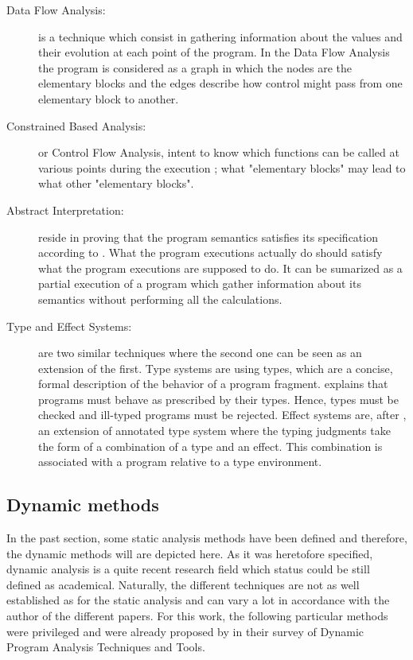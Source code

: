 \begin{description}
  \item[Data Flow Analysis:] is a technique which consist in gathering information about the values and their evolution at each point of the program. In the Data Flow Analysis the program is considered as a graph in which the nodes are the elementary blocks and the edges describe how control might pass from one elementary block to another.
  
  \item[Constrained Based Analysis:] or Control Flow Analysis, intent to know which functions can be called at various points during the execution ; what "elementary blocks" may lead to what other "elementary blocks".
  
  \item[Abstract Interpretation:] reside in proving that the program semantics satisfies its specification according to \cite{Cousot2008}. What the program executions actually do should satisfy what the program executions are supposed to do. It can be sumarized as a partial execution of a program which gather information about its semantics without performing all the calculations.
  
  \item[Type and Effect Systems:] are two similar techniques where the second one can be seen as an extension of the first. Type systems are using types, which are a concise, formal description of the behavior of a program fragment. \cite{Remy2017} explains that programs must behave as prescribed by their types. Hence, types must be checked and ill-typed programs must be rejected. Effect systems are, after \cite{Nielson1999}, an extension of annotated type system where the typing judgments take the form of a combination of a type and an effect. This combination is associated with a program relative to a type environment.
\end{description}


\subsection{Dynamic methods}

In the past section, some static analysis methods have been defined and therefore, the dynamic methods will are depicted here. As it was heretofore specified, dynamic analysis is a quite recent research field which status could be still defined as academical. Naturally, the different techniques are not as well established as for the static analysis and can vary a lot in accordance with the author of the different papers. For this work, the following particular methods were privileged and were already proposed by \cite{Gosain2015} in their survey of Dynamic Program Analysis Techniques and Tools. 

